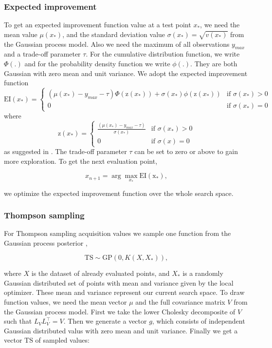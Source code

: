 \subsubsection{Expected improvement}
To get an expected improvement function value at a test point $x_*$, we need the mean value $\mu(x_*)$, and the standard deviation value $\sigma(x_*) = \sqrt{v(x_*)}$ from the Gaussian process model. Also we need the maximum of all observations $y_{max}$ and a trade-off parameter $\tau$. For the cumulative distribution function, we write $\Phi(.)$ and for the probability density function we write $\phi(.)$. They are both Gaussian with zero mean and unit variance. We adopt the expected improvement function
\[
    \mathrm{EI}(x_*)=
\begin{cases}
    (\mu(x_*) - y_{max} - \tau)\Phi(\mathrm{z}(x_*))+\sigma(x_*)\phi(\mathrm{z}(x_*))& \text{if } \sigma(x_*)> 0\\
    0 & \text{if } \sigma(x_*)= 0
\end{cases}
\]
where
\[
    \mathrm{z}(x_*)=
\begin{cases}
    \frac{(\mu(x_*) -y_{max} - \tau)}{\sigma(x_*)} & \text{if } \sigma(x_*)> 0\\
    0 & \text{if } \sigma(x)= 0
\end{cases}
\]
as suggested in \cite{brochu2010tutorial}. The trade-off parameter $\tau$ can be set to zero or above to gain more exploration. To get the next evaluation point,

$$x_{n+1} = \arg \max_{x_*} \mathrm{EI(x_*)},$$

we optimize the expected improvement function over the whole search space.

\subsubsection{Thompson sampling}
For Thompson sampling acquisition values we sample one function from the Gaussian process posterior \cite{shahriari2016taking},

$$\mathrm{TS}\sim \mathrm{GP}(0,K(X,X_*)),$$

where $X$ is the dataset of already evaluated points, and $X_*$ is a randomly Gaussian distributed set of points with mean and variance given by the local optimizer. These mean and variance represent our current search space.
To draw function values, we need the mean vector $\mu$ and the full covariance matrix $V$ from the Gaussian process model. First we take the lower Cholesky decomposite of $V$ such that $L_V L_V^\top = V$. Then we generate a vector $g$, which consists of independent Gaussian distributed valus with zero mean and unit variance. Finally we get a vector $\mathrm{TS}$ of sampled values:

